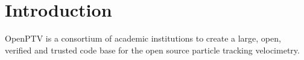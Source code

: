 \chapter{Introduction}

OpenPTV is a consortium of academic institutions to create a large, open, verified and trusted code base for the open source particle tracking velocimetry. 
